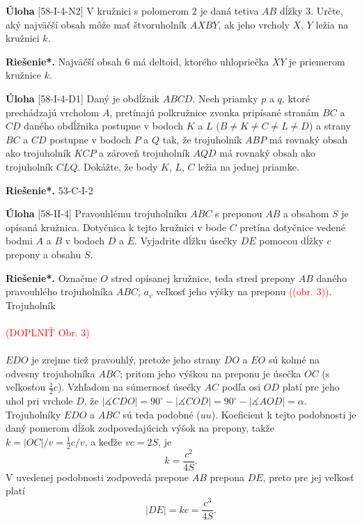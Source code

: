 \documentclass{article}
\newcommand{\rieh}{\textbf{Riešenie*.} }
\newcommand{\ma}{\measuredangle}
\newcommand\todo[1]{\noindent\textcolor{red}{(#1)}}
\newcommand{\problem}[4]{
  \begin{tcolorbox}[breakable,notitle,boxrule=0pt,colback=light-gray,colframe=light-gray]
    \textbf{Úloha}
    [#1] #3
  \end{tcolorbox}
  \noindent#4
}
\begin{document}
\problem{58-I-4-N2}{}{
V kružnici s polomerom 2 je daná tetiva $AB$ dĺžky 3. Určte, aký najväčší obsah môže
mať štvoruholník $AXBY$, ak jeho vrcholy $X$, $Y$ ležia na kružnici $k$.
}{
\rieh Najväčší obsah 6 má deltoid, ktorého uhlopriečka $XY$ je priemerom kružnice $k$.
}

\problem{58-I-4-D1}{}{
Daný je obdĺžnik $ABCD$. Nech priamky $p$ a $q$, ktoré prechádzajú vrcholom $A$, pretínajú
polkružnice zvonka pripísané stranám $BC$ a $CD$ daného obdĺžnika postupne v bodoch
$K$ a $L$ ($B\neq K \neq C \neq L \neq D$) a strany $BC$ a $CD$ postupne v bodoch $P$ a $Q$ tak, že trojuholník $ABP$ má rovnaký obsah ako trojuholník $KCP$ a zároveň trojuholník
$AQD$ má rovnaký obsah ako trojuholník $CLQ$. Dokážte, že body $K$, $L$, $C$ ležia na
jednej priamke.
}{
\rieh 53-C-I-2
}

\problem{58-II-4}{}{
Pravouhlému trojuholníku $ABC$ s preponou $AB$ a obsahom $S$ je opísaná kružnica. Dotyčnica k tejto kružnici v bode $C$ pretína dotyčnice vedené bodmi $A$ a $B$ v bodoch $D$ a $E$. Vyjadrite dĺžku úsečky $DE$ pomocou dĺžky $c$ prepony a obsahu $S$.
}{
\rieh Označme $O$ stred opísanej kružnice, teda stred prepony $AB$ daného pravouhlého trojuholníka $ABC$, $a_v$ veľkosť jeho výšky na preponu \todo{(obr. 3)}. Trojuholník\\
\\
\todo{DOPLNIŤ Obr. 3}\\
\\
$EDO$ je zrejme tiež pravouhlý, pretože jeho strany $DO$ a $EO$ sú kolmé na odvesny
trojuholníka $ABC$; pritom jeho výškou na preponu je úsečka $OC$ (s veľkosťou $\frac{1}{2}c$). Vzhľadom na súmernosť úsečky $AC$ podľa osi $OD$ platí pre jeho uhol pri vrchole $D$, že $|\ma CDO| = 90^\circ - |\ma COD| = 90^\circ - |\ma AOD| = \alpha$. Trojuholníky $EDO$ a $ABC$ sú teda
podobné ($uu$). Koeficient k tejto podobnosti je daný pomerom dĺžok zodpovedajúcich
výšok na prepony, takže $k = |OC|/v = \frac{1}{2}c/v$, a keďže $vc = 2S$, je
$$k =\frac{c^2}{4S}.$$
V uvedenej podobnosti zodpovedá prepone $AB$ prepona $DE$, preto pre jej veľkosť platí
$$|DE| = kc =\frac{c^3}{4S}.$$

}
\end{document}
